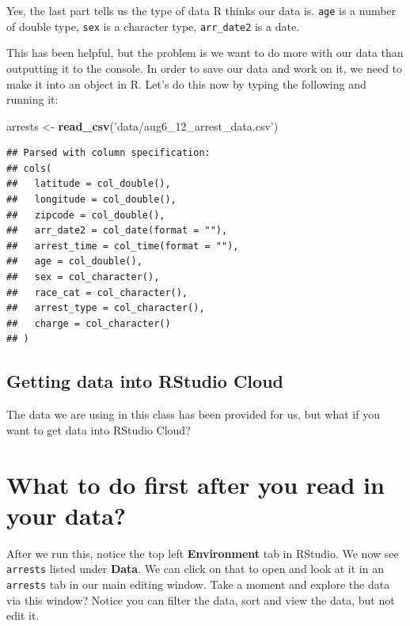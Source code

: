 \documentclass[]{book}
\newenvironment{Shaded}{\begin{snugshade}}{\end{snugshade}}
\newcommand{\KeywordTok}[1]{\textcolor[rgb]{0.13,0.29,0.53}{\textbf{#1}}}
\newcommand{\NormalTok}[1]{#1}
\newcommand{\StringTok}[1]{\textcolor[rgb]{0.31,0.60,0.02}{#1}}
\begin{document}
Yes, the last part tells us the type of data R thinks our data is. \texttt{age} is a number of double type, \texttt{sex} is a character type, \texttt{arr\_date2} is a date.

This has been helpful, but the problem is we want to do more with our data than outputting it to the console. In order to save our data and work on it, we need to make it into an object in R. Let's do this now by typing the following and running it:

\begin{Shaded}
\begin{Highlighting}[]
\NormalTok{arrests <-}\StringTok{ }\KeywordTok{read_csv}\NormalTok{(}\StringTok{'data/aug6_12_arrest_data.csv'}\NormalTok{)}
\end{Highlighting}
\end{Shaded}

\begin{verbatim}
## Parsed with column specification:
## cols(
##   latitude = col_double(),
##   longitude = col_double(),
##   zipcode = col_double(),
##   arr_date2 = col_date(format = ""),
##   arrest_time = col_time(format = ""),
##   age = col_double(),
##   sex = col_character(),
##   race_cat = col_character(),
##   arrest_type = col_character(),
##   charge = col_character()
## )
\end{verbatim}

\begin{callout}
\hypertarget{getting-data-into-rstudio-cloud}{%
\subsection{Getting data into RStudio
Cloud}\label{getting-data-into-rstudio-cloud}}

The data we are using in this class has been provided for us, but what
if you want to get data into RStudio Cloud?
\end{callout}

\hypertarget{what-to-do-first-after-you-read-in-your-data}{%
\section{What to do first after you read in your data?}\label{what-to-do-first-after-you-read-in-your-data}}

After we run this, notice the top left \textbf{Environment} tab in RStudio. We now see \texttt{arrests} listed under \textbf{Data}. We can click on that to open and look at it in an \texttt{arrests} tab in our main editing window. Take a moment and explore the data via this window? Notice you can filter the data, sort and view the data, but not edit it.
\end{document}
